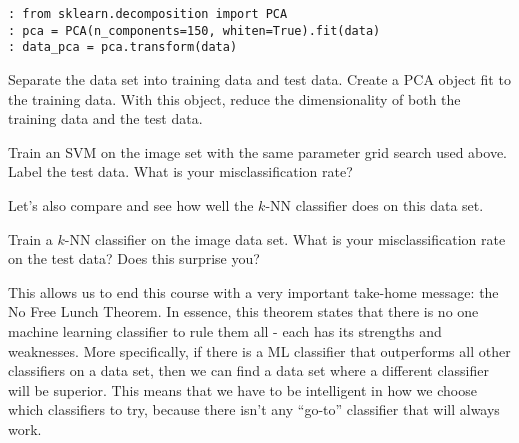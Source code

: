 \begin{lstlisting}[style=python]
: from sklearn.decomposition import PCA
: pca = PCA(n_components=150, whiten=True).fit(data)
: data_pca = pca.transform(data)
\end{lstlisting}

\begin{problem}
Separate the data set into training data and test data. Create a PCA object fit to the training data. With this object, reduce the dimensionality of both the training data and the test data.
\end{problem}

\begin{problem}
Train an SVM on the image set with the same parameter grid search used above. Label the test data. What is your misclassification rate?
\end{problem}

Let's also compare and see how well the $k$-NN classifier does on this data set.

\begin{problem}
Train a $k$-NN classifier on the image data set. What is your misclassification rate on the test data? Does this surprise you?
\end{problem}

This allows us to end this course with a very important take-home message: the No Free Lunch Theorem. In essence, this theorem states that there is no one machine learning classifier to rule them all - each has its strengths and weaknesses. More specifically, if there is a ML classifier that outperforms all other classifiers on a data set, then we can find a data set where a different classifier will be superior. This means that we have to be intelligent in how we choose which classifiers to try, because there isn't any ``go-to'' classifier that will always work.

